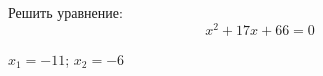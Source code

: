 \begin{ex}
	Решить уравнение:
	$$ x^2+17x+66=0 $$
	\begin{answer}
		$x_1=-11$; $x_2=-6$
	\end{answer}
\end{ex}